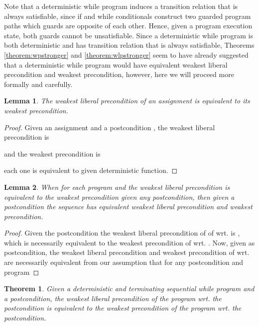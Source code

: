 \documentclass[times]{elsarticle}
\newtheorem{theorem}{Theorem}
\newtheorem{lemma}{Lemma}
\begin{document}
Note that a deterministic while program induces a transition relation
that is always satisfiable, since if and while conditionals construct
two guarded program paths which guards are opposite of each
other. Hence, given a program execution state, both guards cannot be
unsatisfiable. Since a deterministic while program is both
deterministic and has transition relation that is always satisfiable,
Theorems \ref{theorem:wpstronger} and \ref{theorem:wlpstronger} seem
to have already suggested that a deterministic while program would
have equivalent weakest liberal precondition and weakest precondition,
however, here we will proceed more formally and carefully.
\begin{lemma} \label{lemma:equivalent}
The weakest liberal precondition of an assignment is equivalent to its weakest precondition.
\end{lemma}

\begin{proof}
  Given an assignment  and a postcondition , the
  weakest liberal precondition is

and the weakest precondition is 

each one is equivalent to  given  deterministic
function.
\end{proof}

\begin{lemma} \label{lemma:sequence}
  When for each program  and  the weakest liberal
  precondition is equivalent to the weakest precondition given any
  postcondition, then given a postcondition 
  the sequence  has equivalent weakest liberal precondition and
  weakest precondition.
\end{lemma}

\begin{proof}
  Given the postcondition  the weakest
  liberal precondition of of  wrt.  is
  , which is necessarily equivalent to the weakest
  precondition of  wrt. . Now, given
   as postcondition, the weakest liberal precondition
  and weakest precondition of  wrt.  are
  necessarily equivalent from our assumption that for any
  postcondition  and program  
\end{proof}

\begin{theorem} \label{theorem:deterministic}
  Given a deterministic and terminating sequential while program 
  and a postcondition, the weakest liberal precondition of the program 
  wrt. the postcondition is equivalent to the weakest precondition of 
  the program wrt. the postcondition. 
\end{theorem}
\end{document}
